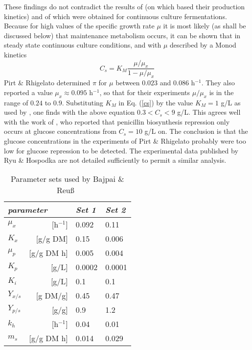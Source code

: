 \documentclass{kluwer}    %
\begin{document}
\begin{article}
These findings do not contradict the results of 
\citeauthor{Chin88-book} (on which  based their 
production kinetics) and of \citeyear{ChinThesis} which were obtained for
continuous culture fermentations.                
Because for high values of the specific
growth rate $\mu$ it is most likely (as shall be discussed below) that 
maintenance metabolism occurs, it can be shown that
in steady state continuous culture conditions, and with $\mu$ described by a Monod kinetics
\begin{equation}
    C_{s}  =  K_{M} \frac{\mu/\mu_{x}}{1-\mu/\mu_{x}} \label{cs}
\end{equation}
Pirt \& Rhigelato determined $\pi$ for $\mu$ between 
$0.023$ and $0.086$ h$^{-1}$.
They also reported a value $\mu_{x} \approx 0.095$
h$^{-1}$, so that for their experiments $\mu/\mu_{x}$ is in the range 
of $0.24$ to $0.9$. 
Substituting $K _M$ in Eq. (\ref{cs}) by 
the value $K_{M}=1$ g/L as used by \cite{Bunt}, one finds
with the above equation $0.3 < C_{s} < 9$ g/L. This agrees well with 
the work of  , who reported that penicillin biosynthesis 
repression only occurs at glucose concentrations from $C_{s}=10$ g/L on.
The conclusion is that the glucose concentrations in the experiments of 
Pirt \& Rhigelato probably were too low for glucose repression to be 
detected. The experimental data published by Ryu \& Hospodka 
are not detailed sufficiently to permit a similar analysis.



\begin{table} 
\caption[]{Parameter sets used by Bajpai \& Reu\ss\ } 
\begin{tabular}{lrll}                                       
\hline
\multicolumn{2}{l}{\it parameter} & {\it Set 1} & {\it Set 2}\\ 
\hline  
$\mu_{x}$           & [h$^{-1}$]  & 0.092       & 0.11          \\
$K_{x}$             & [g/g DM]     & 0.15        & 0.006         \\
$\mu_{p}$           & [g/g DM h]  & 0.005       & 0.004         \\
$K_{p}$             & [g/L]        & 0.0002      & 0.0001        \\
$K_{i}$             & [g/L]        & 0.1         & 0.1           \\
$Y_{x/s}$           & [g DM/g]     & 0.45        & 0.47          \\
$Y_{p/s}$           & [g/g]        & 0.9         & 1.2           \\
$k_{h}$             & [h$^{-1}$]  & 0.04        & 0.01          \\
$m_{s}$             & [g/g DM h]  & 0.014       & 0.029         \\ 
\hline
\end{tabular}
\end{table}
       

\end{article}
\end{document}
